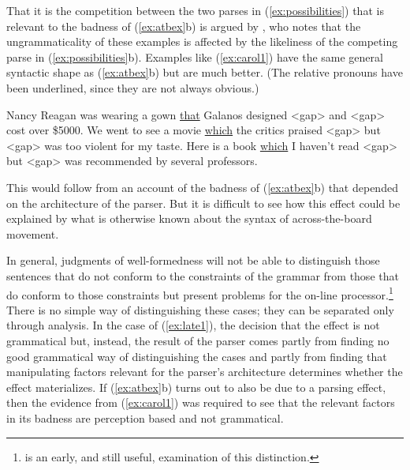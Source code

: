 {That it is the competition between the two parses in (\ref{ex:possibilities}) that is relevant to the badness of (\ref{ex:atbex}b) is argued by \citet{Anderson:1983}, who notes that the ungrammaticality of these examples is affected by the likeliness of the competing parse in (\ref{ex:possibilities}b). Examples like (\ref{ex:carol1}) have the same general syntactic shape as (\ref{ex:atbex}b) but are much better. (The relative pronouns have been underlined, since they are not always obvious.)
\begin{exe}
	\raggedright
	\ex \label{ex:carol1} 
	\begin{xlist}
		\ex Nancy Reagan was wearing a gown \underline{that} Galanos designed <gap> and <gap> cost over \$5000.
		\ex We went to see a movie \underline{which} the critics praised <gap> but <gap> was too violent for my taste.
		Here is a book \underline{which}  I haven't read <gap> but <gap> was recommended by several professors.
	\end{xlist}
	\hspace*{\fill} \citep[(2): 3]{Anderson:1983} \hspace*{.5in}
\end{exe}
This would follow from an account of the badness of (\ref{ex:atbex}b) that depended on the architecture of the parser. But it is difficult to see how this effect could be explained by what is otherwise known about the syntax of across-the-board movement. 

In general, judgments of well-formedness will not be able to distinguish those sentences that do not conform to the constraints of the grammar from those that do conform to those constraints but present problems for the on-line processor.\footnote{\citet{Chomsky:1963} is an early, and still useful, examination of this distinction.} There is no simple way of distinguishing these cases; they can be separated only through analysis. In the case of (\ref{ex:late1}), the decision that the effect is not grammatical but, instead, the result of the parser comes partly from finding no good grammatical way of distinguishing the cases and partly from finding that manipulating factors relevant for the parser's architecture determines whether the effect materializes. If (\ref{ex:atbex}b) turns out to also be due to a parsing effect, then the evidence from (\ref{ex:carol1}) was required to see that the relevant factors in its badness are perception based and not grammatical.

}
